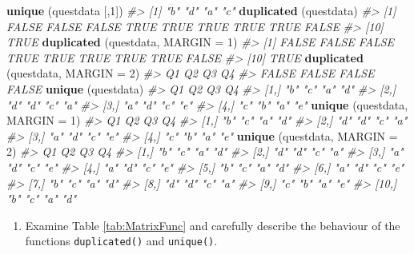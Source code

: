 \documentclass[
]{book}
\newenvironment{Shaded}{\begin{snugshade}}{\end{snugshade}}
\newcommand{\AttributeTok}[1]{\textcolor[rgb]{0.13,0.29,0.53}{#1}}
\newcommand{\CommentTok}[1]{\textcolor[rgb]{0.56,0.35,0.01}{\textit{#1}}}
\newcommand{\DecValTok}[1]{\textcolor[rgb]{0.00,0.00,0.81}{#1}}
\newcommand{\FunctionTok}[1]{\textcolor[rgb]{0.13,0.29,0.53}{\textbf{#1}}}
\newcommand{\NormalTok}[1]{#1}
\providecommand{\tightlist}{%
  \setlength{\itemsep}{0pt}\setlength{\parskip}{0pt}}
\begin{document}
\begin{Shaded}
\begin{Highlighting}[]
\FunctionTok{unique}\NormalTok{ (questdata [,}\DecValTok{1}\NormalTok{])}
\CommentTok{\#\textgreater{} [1] "b" "d" "a" "c"}
\FunctionTok{duplicated}\NormalTok{ (questdata)}
\CommentTok{\#\textgreater{}  [1] FALSE FALSE FALSE  TRUE  TRUE  TRUE  TRUE  TRUE FALSE}
\CommentTok{\#\textgreater{} [10]  TRUE}
\FunctionTok{duplicated}\NormalTok{ (questdata, }\AttributeTok{MARGIN =} \DecValTok{1}\NormalTok{)}
\CommentTok{\#\textgreater{}  [1] FALSE FALSE FALSE  TRUE  TRUE  TRUE  TRUE  TRUE FALSE}
\CommentTok{\#\textgreater{} [10]  TRUE}
\FunctionTok{duplicated}\NormalTok{ (questdata, }\AttributeTok{MARGIN =} \DecValTok{2}\NormalTok{)}
\CommentTok{\#\textgreater{}    Q1    Q2    Q3    Q4 }
\CommentTok{\#\textgreater{} FALSE FALSE FALSE FALSE}
\FunctionTok{unique}\NormalTok{ (questdata)}
\CommentTok{\#\textgreater{}      Q1  Q2  Q3  Q4 }
\CommentTok{\#\textgreater{} [1,] "b" "c" "a" "d"}
\CommentTok{\#\textgreater{} [2,] "d" "d" "c" "a"}
\CommentTok{\#\textgreater{} [3,] "a" "d" "c" "e"}
\CommentTok{\#\textgreater{} [4,] "c" "b" "a" "e"}
\FunctionTok{unique}\NormalTok{ (questdata, }\AttributeTok{MARGIN =} \DecValTok{1}\NormalTok{)}
\CommentTok{\#\textgreater{}      Q1  Q2  Q3  Q4 }
\CommentTok{\#\textgreater{} [1,] "b" "c" "a" "d"}
\CommentTok{\#\textgreater{} [2,] "d" "d" "c" "a"}
\CommentTok{\#\textgreater{} [3,] "a" "d" "c" "e"}
\CommentTok{\#\textgreater{} [4,] "c" "b" "a" "e"}
\FunctionTok{unique}\NormalTok{ (questdata, }\AttributeTok{MARGIN =} \DecValTok{2}\NormalTok{)}
\CommentTok{\#\textgreater{}       Q1  Q2  Q3  Q4 }
\CommentTok{\#\textgreater{}  [1,] "b" "c" "a" "d"}
\CommentTok{\#\textgreater{}  [2,] "d" "d" "c" "a"}
\CommentTok{\#\textgreater{}  [3,] "a" "d" "c" "e"}
\CommentTok{\#\textgreater{}  [4,] "a" "d" "c" "e"}
\CommentTok{\#\textgreater{}  [5,] "b" "c" "a" "d"}
\CommentTok{\#\textgreater{}  [6,] "a" "d" "c" "e"}
\CommentTok{\#\textgreater{}  [7,] "b" "c" "a" "d"}
\CommentTok{\#\textgreater{}  [8,] "d" "d" "c" "a"}
\CommentTok{\#\textgreater{}  [9,] "c" "b" "a" "e"}
\CommentTok{\#\textgreater{} [10,] "b" "c" "a" "d"}
\end{Highlighting}
\end{Shaded}

\begin{enumerate}
\def\labelenumi{(\roman{enumi})}
\setcounter{enumi}{1}
\tightlist
\item
  Examine Table \ref{tab:MatrixFunc} and carefully describe the behaviour of the functions \texttt{duplicated()} and \texttt{unique()}.
\end{enumerate}
\end{document}
